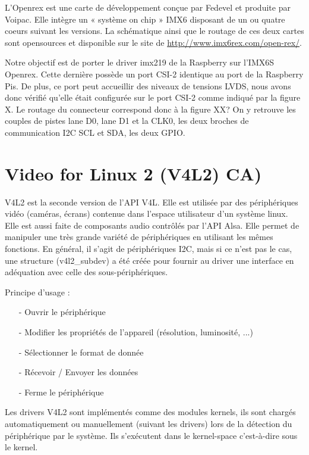 L’Openrex est une carte de développement conçue par Fedevel et produite par Voipac.
Elle intègre un « système on chip » IMX6 disposant de un ou quatre coeurs suivant les
versions. La schématique ainsi que le routage de ces deux cartes sont opensources et
disponible sur le site de \href{http://www.imx6rex.com/open-rex/}{http://www.imx6rex.com/open-rex/}.


Notre objectif est de porter le driver imx219 de la Raspberry sur l’IMX6S Openrex. Cette
dernière possède un port CSI-2 identique au port de la Raspberry Pis. De plus, ce port peut accueillir des niveaux de tensions LVDS, nous avons donc vérifié qu’elle était
configurée sur le port CSI-2 comme indiqué par la figure X. Le routage du connecteur
correspond donc à la figure XX? On y retrouve les couples de pistes lane D0, lane D1 et la 
CLK0, les deux broches de communication I2C SCL et SDA, les deux GPIO.

\section{Video for Linux 2 (V4L2) CA)}

V4L2 est la seconde version de l’API V4L. Elle est utilisée par des périphériques vidéo
(caméras, écrans) contenue dans l’espace utilisateur d’un système linux. Elle est aussi
faite de composants audio contrôlés par l’API Alsa. Elle permet de manipuler une très
grande variété de périphériques en utilisant les mêmes fonctions. En général, il s’agit de
périphériques I2C, mais si ce n’est pas le cas, une structure (v4l2\_subdev) a été créée
pour fournir au driver une interface en adéquation avec celle des sous-périphériques.

Principe d'usage :

\begin{itemize}
    \item[-] Ouvrir le périphérique
    \item[-] Modifier les propriétés de l'appareil (résolution, luminosité, ...)
    \item[-] Sélectionner le format de donnée
    \item[-] Récevoir / Envoyer les données
    \item[-] Ferme le périphérique
\end{itemize}

Les drivers V4L2 sont implémentés comme des modules kernels, ils sont chargés
automatiquement ou manuellement (suivant les drivers) lors de la détection du
périphérique par le système. Ils s’exécutent dans le kernel-space c’est-à-dire sous le
kernel.

